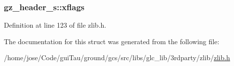 \hypertarget{structgz__header__s_a40e35dc1a967c6537c6012cf5416210a}{
\subsubsection[{xflags}]{ gz\-\_\-header\-\_\-s\-::xflags}}\label{structgz__header__s_a40e35dc1a967c6537c6012cf5416210a}


Definition at line 123 of file zlib.\-h.



The documentation for this struct was generated from the following file\-:\begin{DoxyCompactItemize}
\item 
/home/jose/\-Code/gui\-Tau/ground/gcs/src/libs/glc\-\_\-lib/3rdparty/zlib/\hyperlink{zlib_8h}{zlib.\-h}\end{DoxyCompactItemize}
